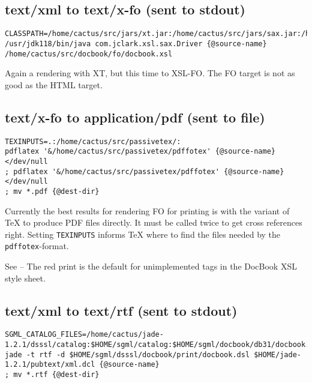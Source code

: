 

\subsection*{text/xml to text/x-fo (sent to stdout)}
  {\footnotesize
\begin{verbatim}
CLASSPATH=/home/cactus/src/jars/xt.jar:/home/cactus/src/jars/sax.jar:/home/cactus/src/jars/xp.jar
/usr/jdk118/bin/java com.jclark.xsl.sax.Driver {@source-name} /home/cactus/src/docbook/fo/docbook.xsl
\end{verbatim}
  }

Again a rendering with XT, but this time to XSL-FO.  The FO target is
not as good as the HTML target.

\subsection*{text/x-fo to application/pdf (sent to file)}
  {\footnotesize
\begin{verbatim}
TEXINPUTS=.:/home/cactus/src/passivetex/:
pdflatex '&/home/cactus/src/passivetex/pdffotex' {@source-name}</dev/null
; pdflatex '&/home/cactus/src/passivetex/pdffotex' {@source-name}</dev/null
; mv *.pdf {@dest-dir}
\end{verbatim}
}

Currently the best results for rendering FO for printing is
 with the  variant of {\TeX} to produce
PDF files directly.  It must be called twice to get cross references
right.  Setting \texttt{TEXINPUTS} informs {\TeX} where to find the
files needed by the \texttt{pdffotex}-format.


See  -- The red print is
  the default for unimplemented tags in the DocBook XSL style sheet.

\subsection*{text/xml to text/rtf (sent to stdout)}
  {\footnotesize
\begin{verbatim}
SGML_CATALOG_FILES=/home/cactus/jade-1.2.1/dsssl/catalog:$HOME/sgml/catalog:$HOME/sgml/docbook/db31/docbook.cat
jade -t rtf -d $HOME/sgml/dsssl/docbook/print/docbook.dsl $HOME/jade-1.2.1/pubtext/xml.dcl {@source-name}
; mv *.rtf {@dest-dir}
\end{verbatim}
}

